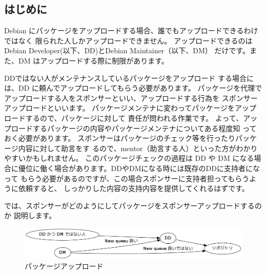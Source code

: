 \documentclass[mingoth,a4paper]{jsarticle}
\begin{document}



\label{sec:sponsorupload}

\subsection{はじめに}

Debian にパッケージをアップロードする場合、誰でもアップロードできるわけではなく
限られた人しかアップロードできません。
アップロードできるのはDebian Developer(以下、DD)とDebian Maintainer（以下、DM）
だけです。また、DM はアップロードする際に制限があります。


%


DDではない人がメンテナンスしているパッケージをアップロード
する場合には、DD に頼んでアップロードしてもらう必要があります。
パッケージを代理でアップロードする人をスポンサーといい、アップロードする行為を
スポンサーアップロードといいます。
パッケージメンテナに変わってパッケージをアップロードするので、パッケージに対して
責任が問われる作業です。
よって、アップロードするパッケージの内容やパッケージメンテナについてある程度知
っておく必要があります。
スポンサーはパッケージのチェック等を行ったりパッケージ内容に対して助言をす
るので、mentor（助言する人）といった方がわかりやすいかもしれません。
このパッケージチェックの過程は DD や DM
になる場合に優位に働く場合があります。DDやDMになる時には既存のDDに支持者になって
もらう必要があるのですが、この場合スポンサーに支持者担ってもらうように依頼すると、
しっかりした内容の支持内容を提供してくれるはずです。

では、スポンサーがどのようにしてパッケージをスポンサーアップロードするのか
説明します。

\begin{figure}[ht]
 \begin{center}
  \includegraphics[width=0.8\hsize]{image201108/sponsor0.png}
 \end{center}
\label{fig:sponsor0}\caption{パッケージアップロード}
\end{figure}
\end{document}
